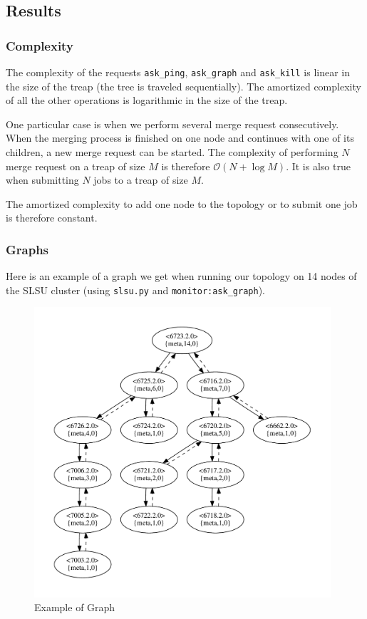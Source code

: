 \documentclass[a4paper, 11pt]{article}
\begin{document}
\subsection{Results}

\subsubsection{Complexity}

The complexity of the requests \verb|ask_ping|, \verb|ask_graph| and \verb|ask_kill| is linear in the size of the treap (the tree is traveled sequentially).
The amortized complexity of all the other operations is logarithmic in the size of the treap.

One particular case is when we perform several merge request consecutively. When the merging process is finished on one node and continues with one of its children, a new merge request can be started. The complexity of performing $N$ merge request on a treap of size $M$ is therefore $\mathcal O(N + \log M)$. It is also true when submitting $N$ jobs to a treap of size $M$.

The amortized complexity to add one node to the topology or to submit one job is therefore constant.

\subsubsection{Graphs}

Here is an example of a graph we get when running our topology on 14 nodes of the SLSU cluster (using \verb|slsu.py| and \verb|monitor:ask_graph|).

\begin{figure}[h!]
\centering
\includegraphics[width=11cm]{graph.pdf}
\caption{Example of Graph}
\end{figure}
\end{document}
